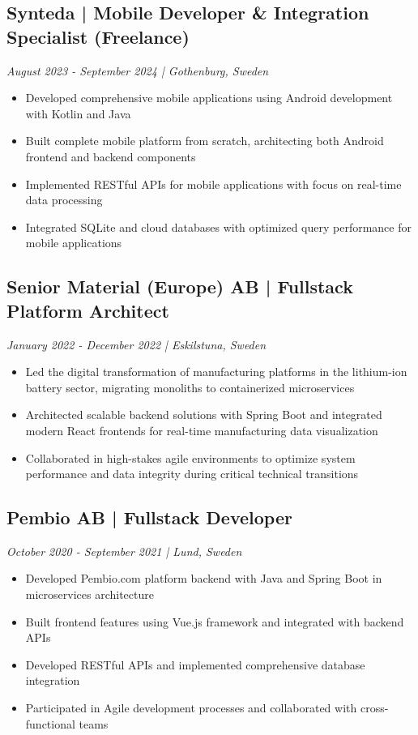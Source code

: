 \documentclass[11pt,a4paper]{article}
\begin{document}
\subsection*{Synteda | Mobile Developer \& Integration Specialist (Freelance)}
\textit{August 2023 - September 2024 | Gothenburg, Sweden}
\begin{itemize}[noitemsep]
\item Developed comprehensive mobile applications using Android development with Kotlin and Java
\item Built complete mobile platform from scratch, architecting both Android frontend and backend components
\item Implemented RESTful APIs for mobile applications with focus on real-time data processing
\item Integrated SQLite and cloud databases with optimized query performance for mobile applications
\end{itemize}

\subsection*{Senior Material (Europe) AB | Fullstack Platform Architect}
\textit{January 2022 - December 2022 | Eskilstuna, Sweden}
\begin{itemize}[noitemsep]
\item Led the digital transformation of manufacturing platforms in the lithium-ion battery sector, migrating monoliths to containerized microservices
\item Architected scalable backend solutions with Spring Boot and integrated modern React frontends for real-time manufacturing data visualization
\item Collaborated in high-stakes agile environments to optimize system performance and data integrity during critical technical transitions
\end{itemize}

\subsection*{Pembio AB | Fullstack Developer}
\textit{October 2020 - September 2021 | Lund, Sweden}
\begin{itemize}[noitemsep]
\item Developed Pembio.com platform backend with Java and Spring Boot in microservices architecture
\item Built frontend features using Vue.js framework and integrated with backend APIs
\item Developed RESTful APIs and implemented comprehensive database integration
\item Participated in Agile development processes and collaborated with cross-functional teams
\end{itemize}
\end{document}
